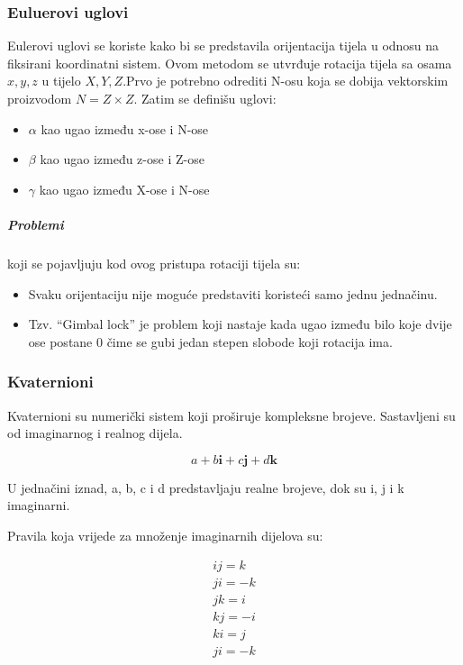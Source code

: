 \documentclass[../Document.tex]{subfiles}
\begin{document}
\subsubsection{Euluerovi uglovi}
Eulerovi uglovi se koriste kako bi se predstavila orijentacija tijela u odnosu na fiksirani koordinatni sistem. Ovom metodom se utvrđuje rotacija tijela sa osama $x,y,z$ u tijelo $X,Y,Z$.Prvo je potrebno odrediti N-osu koja se dobija vektorskim proizvodom $N=Z \times Z$. Zatim se definišu uglovi:

\begin{itemize}
    \item $\alpha$ kao ugao između x-ose i N-ose
    \item $\beta$ kao ugao između z-ose i Z-ose
    \item $\gamma$ kao ugao između X-ose i N-ose
\end{itemize}


\subparagraph{Problemi} koji se pojavljuju kod ovog pristupa rotaciji tijela su:

\begin{itemize}
    \item Svaku orijentaciju nije moguće predstaviti koristeći samo jednu jednačinu.
    \item Tzv. ``Gimbal lock'' je problem koji nastaje kada ugao između bilo koje dvije ose postane 0{\textdegree}  čime se gubi jedan stepen slobode koji rotacija ima.
\end{itemize}

\subsubsection{Kvaternioni}
Kvaternioni su numerički sistem koji proširuje kompleksne brojeve. Sastavljeni su od imaginarnog i realnog dijela.

$$
    a+b\mathbf{i}+c\mathbf{j}+d\mathbf{k}
$$

\noindent U jednačini iznad, a, b, c i d predstavljaju realne brojeve, dok su i, j i k imaginarni.

\noindent Pravila koja vrijede za množenje imaginarnih dijelova su:

\begin{align*}
    ij=k  \\
    ji=-k \\
    jk=i  \\
    kj=-i \\
    ki=j  \\
    ji=-k
\end{align*}
\end{document}

